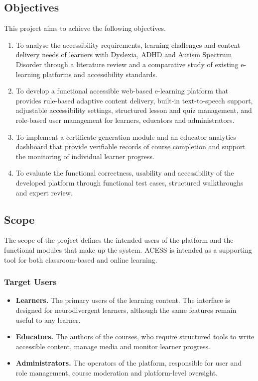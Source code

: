 \documentclass[12pt, oneside]{article} %
\begin{document}
\subsection{Objectives}

This project aims to achieve the following objectives.

\begin{enumerate}
    \item To analyse the accessibility requirements, learning challenges and content delivery needs of learners with Dyslexia, ADHD and Autism Spectrum Disorder through a literature review and a comparative study of existing e-learning platforms and accessibility standards.
    \item To develop a functional accessible web-based e-learning platform that provides rule-based adaptive content delivery, built-in text-to-speech support, adjustable accessibility settings, structured lesson and quiz management, and role-based user management for learners, educators and administrators.
    \item To implement a certificate generation module and an educator analytics dashboard that provide verifiable records of course completion and support the monitoring of individual learner progress.
    \item To evaluate the functional correctness, usability and accessibility of the developed platform through functional test cases, structured walkthroughs and expert review.
\end{enumerate}

\subsection{Scope}

The scope of the project defines the intended users of the platform and the functional modules that make up the system. ACESS is intended as a supporting tool for both classroom-based and online learning.

\subsubsection{Target Users}
\begin{itemize}
    \item \textbf{Learners.} The primary users of the learning content. The interface is designed for neurodivergent learners, although the same features remain useful to any learner.
    \item \textbf{Educators.} The authors of the courses, who require structured tools to write accessible content, manage media and monitor learner progress.
    \item \textbf{Administrators.} The operators of the platform, responsible for user and role management, course moderation and platform-level oversight.
\end{itemize}
\end{document}
